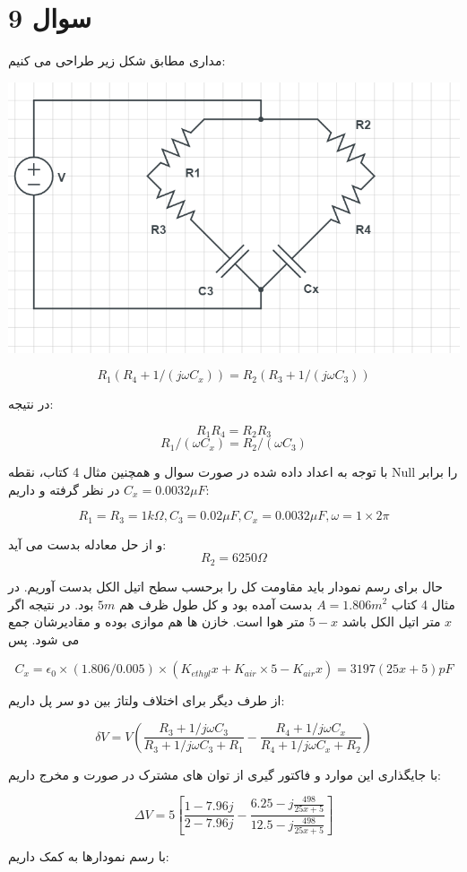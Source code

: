 \documentclass[12pt]{article}
\begin{document}
\newpage
\section*{سوال 9}

مداری مطابق شکل زیر طراحی می کنیم:

\begin{center}
	\includegraphics[width = 0.5 \textwidth]{images/2.png}
\end{center}

$$R_{1} (R_4 + 1/(j \omega C_x) ) = R_2 (R_3 + 1/(j \omega C_3))$$

در نتیجه:

$$R_1 R_4 = R_2 R_3$$
$$R_1/(\omega C_x) = R_2 / (\omega C_3)$$

با توجه به اعداد داده شده در صورت سوال و همچنین مثال 4 کتاب، نقطه Null را برابر $C_x = 0.0032 \mu F$ در نظر گرفته و داریم:

$$R_1 = R_3 = 1 k\Omega , C_3 = 0.02 \mu F , C_x = 0.0032 \mu F , \omega = 1 \times 2 \pi $$

و از حل معادله بدست می آید:
$$R_2 = 6250 \Omega $$

حال برای رسم نمودار باید مقاومت کل را برحسب سطح اتیل الکل بدست آوریم. در مثال 4 کتاب $A=1.806 m^2$ بدست آمده بود و کل طول ظرف هم $5m$ بود. در نتیجه اگر $x$ متر اتیل الکل باشد $5-x$ متر هوا است. خازن ها هم موازی بوده و مقادیرشان جمع می شود. پس

$$C_x = \epsilon_0 \times (1.806 / 0.005) \times (K_{ethyl} x + K_{air} \times 5 - K_{air} x) = 3197 (25x + 5) pF$$

از طرف دیگر برای اختلاف ولتاژ بین دو سر پل داریم:

$$\delta V = V (\frac{R_3 + 1/j \omega C_3}{R_3 + 1/j \omega C_3 + R_1} - \frac{R_4 + 1/j \omega C_x}{R_4 + 1/j \omega C_x  + R_2})$$

با جایگذاری این موارد و فاکتور گیری از توان های مشترک در صورت و مخرج داریم:

$$
\Delta V = 5 \left[\frac{1-7.96 j}{2-7.96 j}-\frac{6.25-j \frac{498}{25 x+5}}{12.5-j \frac{498}{25 x+5}}\right]
$$

با رسم نمودارها به کمک  داریم:
\end{document}
